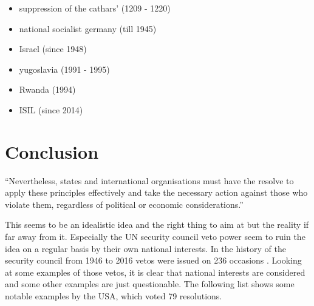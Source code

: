 \begin{itemize}
\item suppression of the cathars' (1209 - 1220)
\item national socialist germany (till 1945)
\item Israel (since 1948)
\item yugoslavia (1991 - 1995)
\item Rwanda (1994)
\item ISIL (since 2014)
\end{itemize}

\section{Conclusion}
``Nevertheless, states and international organisations must have the
resolve to apply these principles effectively and take the necessary
action against those who violate them, regardless of political or
economic considerations.''
\cite[p. 37]{tfohr}

This seems to be an idealistic idea and the right thing to aim at but the
reality if far away from it. Especially the UN security council veto power
seem to ruin the idea on a regular basis by their own national interests.
In the history of the security council from 1946 to 2016 vetos were issued
on 236 occasions \cite{veto}. Looking at some examples of those vetos, it
is clear that national interests are considered and some other examples
are just questionable. The following list shows some notable examples
by the USA, which voted 79 resolutions.

